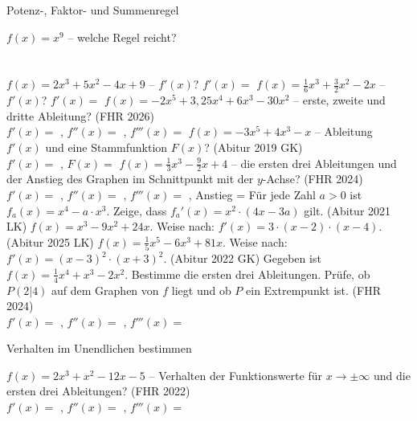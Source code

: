 \begin{aufgabe}{Potenz-, Faktor- und Summenregel}
\begin{teile}
\teil $f(x) = x^9$ – welche Regel reicht? \\  \\  \\ 
\teil $f(x) = 2x^3 + 5x^2 - 4x + 9$ – $f'(x)$? $f'(x) =$ \leerfeld
\teil $f(x) = \frac{1}{6}x^3 + \frac{3}{2}x^2 - 2x$ – $f'(x)$? $f'(x) =$ \leerfeld
\teil $f(x) = -2x^5 + 3{,}25x^4 + 6x^3 - 30x^2$ – erste, zweite und dritte Ableitung? \hfill (FHR 2026) \\ $f'(x) =$ \leerfeld , $f''(x) =$ \leerfeld , $f'''(x) =$ \leerfeld
\teil $f(x) = -3x^5 + 4x^3 - x$ – Ableitung $f'(x)$ und eine Stammfunktion $F(x)$? \hfill (Abitur 2019 GK) \\ $f'(x) =$ \leerfeld , $F(x) =$ \leerfeld
\teil $f(x) = \frac{1}{3}x^3 - \frac{9}{2}x + 4$ – die ersten drei Ableitungen und der Anstieg des Graphen im Schnittpunkt mit der $y$-Achse? \hfill (FHR 2024) \\ $f'(x) =$ \leerfeld , $f''(x) =$ \leerfeld , $f'''(x) =$ \leerfeld , Anstieg = \leerfeld
\teil Für jede Zahl $a > 0$ ist $f_a(x) = x^4 - a \cdot x^3$. Zeige, dass $f_a'(x) = x^2 \cdot (4x - 3a)$ gilt. \hfill (Abitur 2021 LK)
\teil $f(x) = x^3 - 9x^2 + 24x$. Weise nach: $f'(x) = 3 \cdot (x - 2) \cdot (x - 4)$. \hfill (Abitur 2025 LK)
\teil $f(x) = \frac{1}{5}x^5 - 6x^3 + 81x$. Weise nach: $f'(x) = (x - 3)^2 \cdot (x + 3)^2$. \hfill (Abitur 2022 GK)
\teil Gegeben ist $f(x) = \frac{1}{4}x^4 + x^3 - 2x^2$. Bestimme die ersten drei Ableitungen. Prüfe, ob $P(2|4)$ auf dem Graphen von $f$ liegt und ob $P$ ein Extrempunkt ist. \hfill (FHR 2024) \\ $f'(x) =$ \leerfeld , $f''(x) =$ \leerfeld , $f'''(x) =$ \leerfeld
\end{teile}
\end{aufgabe}

\begin{aufgabe}{Verhalten im Unendlichen bestimmen}
\begin{teile}
\teil $f(x) = 2x^3 + x^2 - 12x - 5$ – Verhalten der Funktionswerte für $x \to \pm\infty$ und die ersten drei Ableitungen? \hfill (FHR 2022) \\ $f'(x) =$ \leerfeld , $f''(x) =$ \leerfeld , $f'''(x) =$ \leerfeld
\end{teile}
\end{aufgabe}

